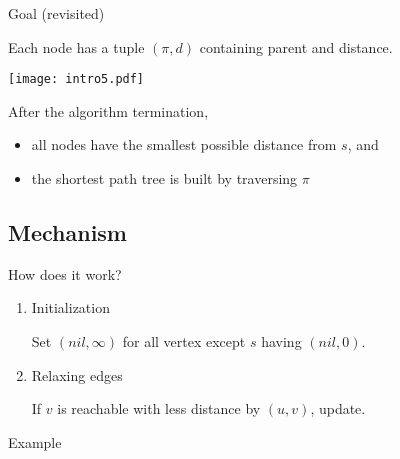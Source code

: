 \documentclass{beamer}
\begin{document}
\begin{frame}{Goal (revisited)}

Each node has a tuple $(\pi,d)$ containing parent and distance.

\texttt{[image: intro5.pdf]}

After the algorithm termination,
\begin{itemize}
\item all nodes have the smallest possible distance from $s$, and
\item the shortest path tree is built by traversing $\pi$
\end{itemize}

\end{frame}

\subsection{Mechanism}

\begin{frame}{How does it work?}

\begin{enumerate}

\item \alert{Initialization}

Set $(nil,\infty)$ for all vertex except $s$ having $(nil,0)$.\newline

\item \alert{Relaxing edges}

If $v$ is reachable with less distance by $(u,v)$, update. 


\end{enumerate}

\end{frame}

\begin{frame}{Example}

\end{frame}
\end{document}
